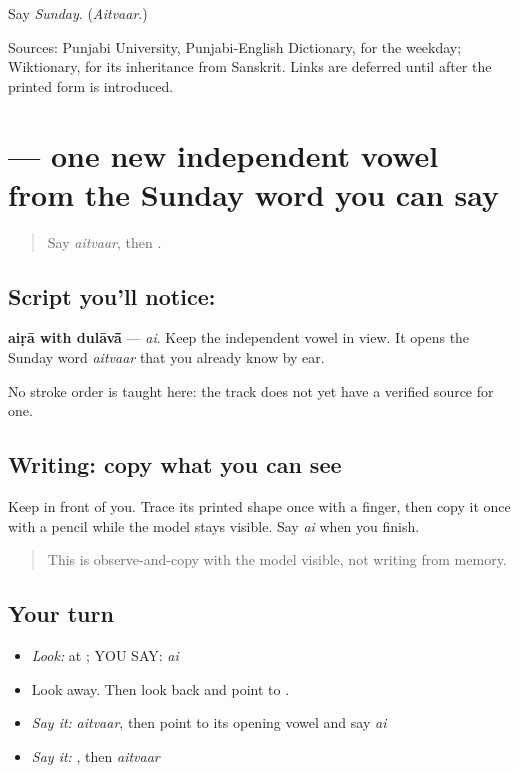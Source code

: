 \begin{tcolorbox}[breakable,colback=teal!4,colframe=teal!35!black,title={Before you move on}]
Say \emph{Sunday}. (\emph{Aitvaar}.)

Sources: Punjabi University, Punjabi-English Dictionary, for the weekday; Wiktionary, for its inheritance from Sanskrit. Links are deferred until after the printed form is introduced.
\end{tcolorbox}
\section[\texorpdfstring{\pa{ਐ} (ai)}{ਐ (ai)}]{ — one new independent vowel from the Sunday word you can say}

\label{lesson:PA-C182-airhaa-ai}



\begin{quote}
Say \emph{aitvaar}, then \textbf{}.
\end{quote}

\subsection*{Script you'll notice: }
\begin{quote}
\end{quote}

\textbf{aiṛā with dulāvā̃} — \emph{ai}. Keep the independent vowel in view. It opens the Sunday word \emph{aitvaar} that you already know by ear.

No stroke order is taught here: the track does not yet have a verified source for one.

\subsection*{Writing: copy what you can see}
Keep \textbf{} in front of you. Trace its printed shape once with a finger, then copy it once with a pencil while the model stays visible. Say \emph{ai} when you finish.

\begin{quote}
This is observe-and-copy with the model visible, not writing from memory.
\end{quote}

\subsection*{Your turn}
\begin{itemize}
\raggedright
  \item \emph{Look:} at \textbf{}; YOU SAY: \emph{ai}
  \item Look away. Then look back and point to \textbf{}.
  \item \emph{Say it:} \emph{aitvaar}, then point to its opening vowel \textbf{} and say \emph{ai}
  \item \emph{Say it:} \textbf{}, then \emph{aitvaar}
\end{itemize}

